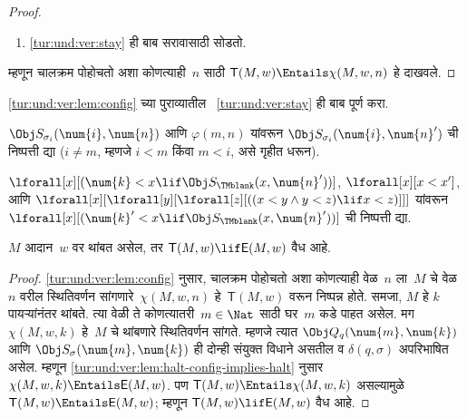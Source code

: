 \begin{proof}
\begin{enumerate}
आधीप्रमाणेच. (पहिल्या बाबतीत
$\num{l}' \ident \num{l+1}
\ident \num{m}$ आणि
दुसऱ्या बाबतीत
$\num{l} \ident \num{0}$
हे लक्षात घ्या.) पण
हेच $\chi(M, w, n+1)$
आहे.

\item \ref{tur:und:ver:stay} ही बाब
सरावासाठी सोडतो.
\end{enumerate}
म्हणून चालक्रम पोहोचतो अशा कोणत्याही~$n$
साठी $\mathsf{T}(M, w) \Entails \chi(M, w, n)$
हे दाखवले.
\end{proof}

\begin{prob}
\ref{tur:und:ver:lem:config}
च्या पुराव्यातील
~\ref{tur:und:ver:stay}
ही बाब पूर्ण करा.
\end{prob}

\begin{prob}
$\Obj S_{\sigma_i}(\num{i}, \num{n})$
आणि $\varphi(m, n)$ यांवरून
$\Obj S_{\sigma_i}(\num{i}, \num{n}')$
ची निष्पत्ती द्या
($i \neq
m$, म्हणजे $i < m$
किंवा $m < i$,
असे गृहीत धरून).
\end{prob}

\begin{prob}
$\lforall[x][(\num{k} < x \lif \Obj
  S_\TMblank(x, \num{n}'))]$,
$\lforall[x][x < x']$,
आणि
$\lforall[x][\lforall[y][\lforall[z][ ((x < y \land y < z) \lif x <
      z)]]]$
यांवरून
$\lforall[x][(\num{k}' < x \lif \Obj
  S_\TMblank(x, \num{n}'))]$
ची निष्पत्ती द्या.
\end{prob}


\begin{lem}
\label{tur:und:ver:lem:valid-if-halt}
$M$ आदान~$w$ वर
थांबत असेल, तर
$\mathsf{T}(M, w) \lif
\mathsf{E}(M, w)$ वैध आहे.
\end{lem}

\begin{proof}
\ref{tur:und:ver:lem:config} नुसार,
चालक्रम पोहोचतो अशा कोणत्याही वेळ~$n$
ला~$M$ चे वेळ~$n$ वरील स्थितिवर्णन
सांगणारे~$\chi(M, w, n)$
हे~$\mathsf{T}(M, w)$ वरून
निष्पन्न होते. समजा,
$M$ हे $k$ पायऱ्यांनंतर
थांबते. त्या वेळी
ते कोणत्यातरी~$m \in \Nat$
साठी घर~$m$ कडे
पाहत असेल. मग
$\chi(M, w, k)$ हे~$M$
चे थांबणारे स्थितिवर्णन
सांगते. म्हणजे त्यात
$\Obj Q_q(\num{m}, \num{k})$
आणि $\Obj
S_\sigma(\num{m}, \num{k})$
ही दोन्ही संयुक्त विधाने
असतील व $\delta(q,\sigma)$
अपरिभाषित असेल. म्हणून
\ref{tur:und:ver:lem:halt-config-implies-halt}
नुसार
$\chi(M, w, k) \Entails \mathsf{E}(M,
w)$. पण
$\mathsf{T}(M, w) \Entails \chi(M, w, k)$
असल्यामुळे
$\mathsf{T}(M, w)
\Entails \mathsf{E}(M, w)$;
म्हणून $\mathsf{T}(M, w) \lif \mathsf{E}(M, w)$
वैध आहे.
\end{proof}


